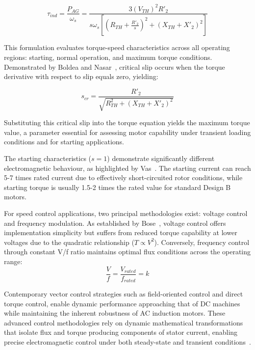 \documentclass[a4paper,12pt]{IEEEtran}
\begin{document}
\begin{equation}
\tau_{ind} = \frac{P_{AG}}{\omega_s} = \frac{3(V_{TH})^2 R'_2}{s\omega_s \left[\left(R_{TH} + \frac{R'_2}{s}\right)^2 + (X_{TH} + X'_2)^2\right]}
\end{equation}

This formulation evaluates torque-speed characteristics across all operating regions: starting, normal operation, and maximum torque conditions. Demonstrated by Boldea and Nasar~\cite{boldea2021}, critical slip occurs when the torque derivative with respect to slip equals zero, yielding:

\begin{equation}
s_{cr} = \frac{R'_2}{\sqrt{R_{TH}^2 + (X_{TH} + X'_2)^2}}
\end{equation}

Substituting this critical slip into the torque equation yields the maximum torque value, a parameter essential for assessing motor capability under transient loading conditions and for starting applications.









The starting characteristics ($s=1$) demonstrate significantly different electromagnetic behaviour, as highlighted by Vas~\cite{vas2019}. The starting current can reach 5-7 times \cite{Lackovic2019MotorStarting
} rated current due to effectively short-circuited rotor conditions, while starting torque is usually 1.5-2 times the rated value for standard Design B motors.

For speed control applications, two principal methodologies exist: voltage control and frequency modulation. As established by Bose~\cite{bose2020}, voltage control offers implementation simplicity but suffers from reduced torque capability at lower voltages due to the quadratic relationship ($T \propto V^2$). Conversely, frequency control through constant V/f ratio maintains optimal flux conditions across the operating range:
\begin{equation}
\frac{V}{f} = \frac{V_{rated}}{f_{rated}} = k
\end{equation}

Contemporary vector control strategies such as field-oriented control and direct torque control, enable dynamic performance approaching that of DC machines while maintaining the inherent robustness of AC induction motors. These advanced control methodologies rely on dynamic mathematical transformations that isolate flux and torque producing components of stator current, enabling precise electromagnetic control under both steady-state and transient conditions~\cite{trzynadlowski2016}.
\end{document}
